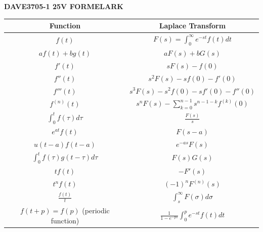 \documentclass[a4paper,12pt]{article}
\begin{document}
\begin{center}
    {\Huge \textbf{DAVE3705-1 25V FORMELARK}}
\end{center}


\renewcommand{\arraystretch}{1.8}
\begin{tabular}{ |c|c| }
    \hline
    \textbf{Function} & \textbf{Laplace Transform} \\
    \hline
    $f(t)$ & $F(s) = \int_{0}^{\infty} e^{-st} f(t) dt$ \\
    \hline
    $a f(t) + b g(t)$ & $a F(s) + b G(s)$ \\
    \hline
    $f'(t)$ & $s F(s) - f(0)$ \\
    \hline
    $f''(t)$ & $s^2 F(s) - s f(0) - f'(0)$ \\
    \hline
    $f'''(t)$ & $s^3 F(s) - s^2 f(0) - s f'(0) - f''(0)$ \\
    \hline
    $f^{(n)}(t)$ & $s^n F(s) - \sum_{k=0}^{n-1} s^{n-1-k} f^{(k)}(0)$ \\
    \hline
    $\int_{0}^{t} f(\tau) d\tau$ & $\frac{F(s)}{s}$ \\
    \hline
    $e^{at} f(t)$ & $F(s-a)$ \\
    \hline
    $u(t-a) f(t-a)$ & $e^{-as} F(s)$ \\
    \hline
    $\int_{0}^{t} f(\tau) g(t-\tau) d\tau$ & $F(s) G(s)$ \\
    \hline
    $t f(t)$ & $-F'(s)$ \\
    \hline
    $t^n f(t)$ & $(-1)^n F^{(n)}(s)$ \\
    \hline
    $\frac{f(t)}{t}$ & $\int_{s}^{\infty} F(\sigma) d\sigma$ \\
    \hline
    $f(t+p) = f(p)$ (periodic function) & $\frac{1}{1 - e^{-ps}} \int_{0}^{p} e^{-st} f(t) dt$ \\
    \hline
\end{tabular}
\end{document}
